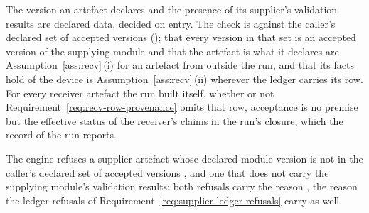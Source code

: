 
The version an artefact declares and the presence of its supplier's
validation results are declared data, decided on entry. The check is against
the caller's declared set of accepted versions
(); that every version in that set is an
accepted version of the supplying module and that the artefact is what it
declares are Assumption~\ref{ass:recv}\,(i) for an artefact from outside the
run, and that its facts hold of the device is Assumption~\ref{ass:recv}\,(ii)
wherever the ledger carries its row. For every receiver artefact the run
built itself, whether or not Requirement~\ref{req:recv-row-provenance} omits
that row, acceptance is no premise but the effective status of the
receiver's claims in the run's closure, which the record of the run
reports.

\begin{requirement}\label{req:supplier-version-accepted}
The engine refuses a supplier artefact whose declared module version
 is not in the caller's declared set of accepted
versions , and one that does not carry the
supplying module's validation results; both refusals carry the reason
, the reason the ledger refusals of
Requirement~\ref{req:supplier-ledger-refusals} carry as well.
\end{requirement}
